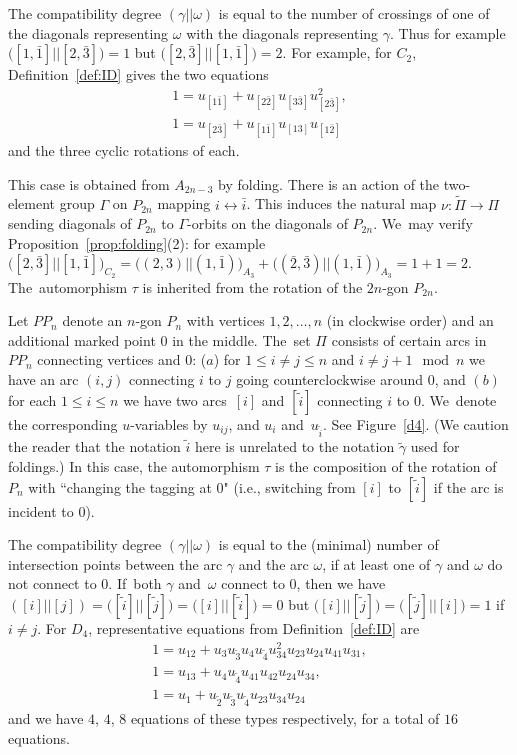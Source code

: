 \documentclass[pdftex]{sigma}%
\def\tgamma{{\tilde \gamma}}
\numberwithin{equation}{section}
\begin{document}
The compatibility degree $(\gamma||\omega)$ is equal to the number of crossings of one of the diagonals representing $\omega$ with the diagonals representing $\gamma$. Thus for example $\big([1, \bar 1]||[2, \bar 3]\big) =1$ but $\big([2,\bar 3] || [1,\bar 1]\big) = 2$. For example, for $C_2$, Definition~\ref{def:ID} gives the two equations
\begin{gather}
1 = u_{[1 \bar 1]} + u_{[2 \bar 2]} u_{[3 \bar 3]} u_{[2 \bar 3]}^2,\nonumber
\\
1 = u_{[2 \bar 3]} + u_{[1 \bar 1]} u_{[13]} u_{[1 \bar 2]}\label{eq:C2}
\end{gather}
and the three cyclic rotations of each.

This case is obtained from $A_{2n-3}$ by folding. There is an action of the two-element group $\Gamma$ on $P_{2n}$ mapping $i \leftrightarrow \bar i$. This induces the natural map $\nu\colon \tilde \Pi \to \Pi$ sending diagonals of $P_{2n}$ to $\Gamma$-orbits on the diagonals of $P_{2n}$. We~may verify Proposition~\ref{prop:folding}(2): for example $\big([2,\bar 3]||[1, \bar 1]\big)_{C_2} = \big((2,3)||(1,\bar 1)\big)_{A_3} + \big((\bar 2, \bar 3)||(1,\bar 1)\big)_{A_3} = 1+ 1 = 2$. The~automorphism $\tau$ is inherited from the rotation of the $2n$-gon $P_{2n}$.

\medskip{} %
Let $PP_n$ denote an $n$-gon $P_n$ with vertices $1,2,\dots,n$ (in clockwise order) and an additional marked point $0$ in the middle. The~set $\Pi$ consists of certain arcs in $PP_n$ connecting vertices and $0$: ($a$) for $1 \leq i \neq j \leq n$ and $i \neq j+1 \mod n$ we have an arc $(i,j)$ connecting $i$ to $j$ going counterclockwise around $0$, and $(b)$ for each $1\leq i \leq n$ we have two arcs~$[i]$ and $[\tilde i]$ connecting $i$ to $0$. We~denote the corresponding $u$-variables by $u_{ij}$, and $u_i$ and~$u_{\tilde i}$. See Figure~\ref{d4}. (We caution the reader that the notation $\tilde i$ here is unrelated to the notation $\tgamma$ used for foldings.) In this case, the automorphism $\tau$ is the composition of the rotation of $P_n$ with ``changing the tagging at 0" (i.e., switching from $[i]$ to $[\tilde i]$ if the arc is incident to $0$).

The compatibility degree $(\gamma || \omega)$ is equal to the (minimal) number of intersection points bet\-ween the arc $\gamma$ and the arc $\omega$, if at least one of $\gamma$ and $\omega$ do not connect to $0$. If~both $\gamma$ and~$\omega$ connect to $0$, then we have $([i] || [j]) = \big([\tilde i] || [\tilde j]\big) = \big([i] || [\tilde i]\big) = 0$ but $\big([i] || [\tilde j]\big) = \big([\tilde j] || [i]\big) = 1$ if $i \neq j$. For $D_4$, representative equations from Definition~\ref{def:ID} are
\begin{gather}
1 = u_{12} + u_3 u_{\tilde3} u_4 u_{\tilde 4} u_{34}^2 u_{23} u_{24} u_{41} u_{31},\nonumber
\\
1 =u_{13} + u_4u_{\tilde 4} u_{41}u_{42} u_{24} u_{34},\nonumber
\\
1 = u_1+ u_{\tilde 2} u_{\tilde 3} u_{\tilde 4} u_{23} u_{34} u_{24}
\label{eq:D4}
\end{gather}
and we have $4$, $4$, $8$ equations of these types respectively, for a total of $16$ equations.
\end{document}
